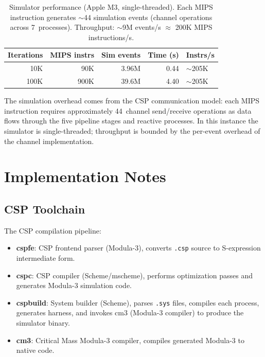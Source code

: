 \documentclass[11pt]{article}
\begin{document}
\begin{table}[ht]
\centering\small
\begin{tabular}{@{}rrrrl@{}}
\toprule
Iterations & MIPS instrs & Sim events & Time (s) & Instrs/s \\
\midrule
10K &   90K  & 3.96M & 0.44 & ${\sim}$205K \\
100K & 900K & 39.6M & 4.40 & ${\sim}$205K \\
\bottomrule
\end{tabular}
\caption{Simulator performance (Apple M3, single-threaded).  Each MIPS
  instruction generates ${\sim}$44 simulation events (channel operations
  across 7~processes).  Throughput: ${\sim}$9M events/s
  $\approx$ 200K MIPS instructions/s.}
\label{tab:perf}
\end{table}

The simulation overhead comes from the CSP communication model: each MIPS
instruction requires approximately 44~channel send/receive operations as data
flows through the five pipeline stages and reactive processes.  In this
instance the simulator is single-threaded; throughput is bounded by the
per-event overhead of the channel implementation.

\section{Implementation Notes}

\subsection{CSP Toolchain}

The CSP compilation pipeline:
\begin{itemize}
\item \textbf{cspfe}: CSP frontend parser (Modula-3), converts \texttt{.csp}
  source to S-expression intermediate form.
\item \textbf{cspc}: CSP compiler (Scheme/mscheme), performs optimization
  passes and generates Modula-3 simulation code.
\item \textbf{cspbuild}: System builder (Scheme), parses \texttt{.sys} files,
  compiles each process, generates harness, and invokes cm3 (Modula-3
  compiler) to produce the simulator binary.
\item \textbf{cm3}: Critical Mass Modula-3 compiler, compiles generated
  Modula-3 to native code.
\end{itemize}
\end{document}
